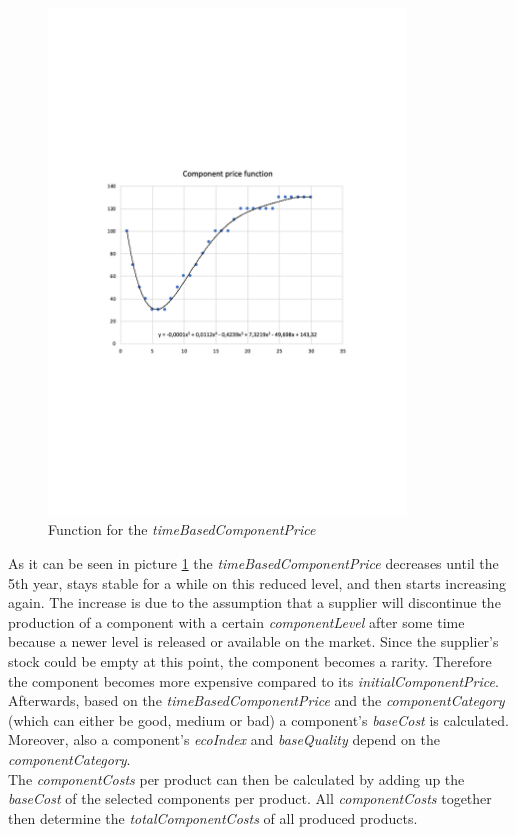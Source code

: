 
\begin{figure}
    \centering
	\includegraphics[width=9.5cm]{images/timeBasedComponentPriceFunction.pdf}
	\caption{Function for the \textit{timeBasedComponentPrice}}
	\label{img:timeBasedComponentPriceFunction}
\end{figure}
As it can be seen in picture \ref{img:timeBasedComponentPriceFunction} the \textit{timeBasedComponentPrice} decreases until the 5th year, stays stable for a while on this reduced level, and then starts increasing again. The increase is due to the assumption that a supplier will discontinue the production of a component with a certain \textit{componentLevel} after some time because a newer level is released or available on the market. Since the supplier’s stock could be empty at this point, the component becomes a rarity. Therefore the component becomes more expensive compared to its \textit{initialComponentPrice}.\\
Afterwards, based on the \textit{timeBasedComponentPrice} and the \textit{componentCategory} (which can either be good, medium or bad) a component's \textit{baseCost} is calculated. Moreover, also a component's \textit{ecoIndex} and \textit{baseQuality} depend on the \textit{componentCategory}.\\
The \textit{componentCosts} per product can then be calculated by adding up the \textit{baseCost} of the selected components per product. All \textit{componentCosts} together then determine the \textit{totalComponentCosts} of all produced products.\\

